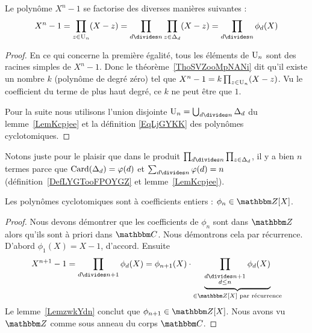 \begin{lemma}   \label{LemKYGBooAwpOHD}
    Le polynôme \( X^n-1\) se factorise des diverses manières suivantes :
    \begin{equation}
        X^n-1=\prod_{z\in \gU_n}(X-z)=\prod_{d\divides n}\prod_{z\in \Delta_d}(X-z)=\prod_{d\divides n}\phi_d(X)
    \end{equation}
\end{lemma}

\begin{proof}
    En ce qui concerne la première égalité, tous les éléments de \( \operatorname{U}_n\) sont des racines simples de \( X^n-1\). Donc le théorème~\ref{ThoSVZooMpNANi} dit qu'il existe un nombre \( k\) (polynôme de degré zéro) tel que \( X^n-1=k\prod_{z\in \operatorname{U}_n}(X-z)\). Vu le coefficient du terme de plus haut degré, ce \( k\) ne peut être que \( 1\).

    Pour la suite nous utilisons l'union disjointe \( \gU_n=\bigcup_{d\divides n}\Delta_d\) du lemme~\ref{LemKcpjee} et la définition \eqref{EqLjGYKK} des polynômes cyclotomiques.
\end{proof}

\begin{remark}
    Notons juste pour le plaisir que dans le produit \( \prod_{d\divides n}\prod_{z\in\Delta_d}\), il y a bien \( n\) termes parce que \( \operatorname{Card}(\Delta_d)=\varphi(d)\) et \( \sum_{d\divides n}\varphi(d)=n\) (définition~\ref{DefLYGTooFPOYGZ} et lemme~\ref{LemKcpjee}).
\end{remark}

\begin{proposition}
    Les polynômes cyclotomiques sont à coefficients entiers : \( \phi_n\in \eZ[X]\).
\end{proposition}

\begin{proof}
            Nous devons démontrer que les coefficients de \( \phi_n\) sont dans \( \eZ\) alors qu'ils sont à priori dans \( \eC\). Nous démontrons cela par récurrence. D'abord \( \phi_1(X)=X-1\), d'accord. Ensuite
            \begin{equation}
                X^{n+1}-1=\prod_{d\divides n+1}\phi_d(X)=\phi_{n+1}(X)\cdot\underbrace{\prod_{_{\substack{d\divides n+1\\d\leq n}}}\phi_d(X)}_{\in\eZ[X]\text{ par récurrence}}
            \end{equation}
            Le lemme~\ref{LemzwkYdn} conclut que \( \phi_{n+1}\in \eZ[X]\). Nous avons vu \( \eZ\) comme sous anneau du corps \( \eC\).
\end{proof}

